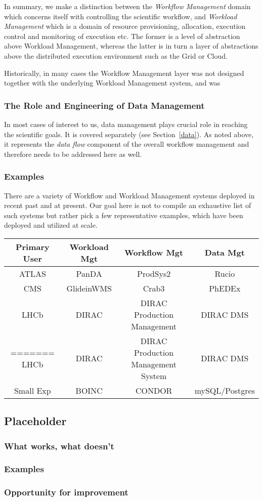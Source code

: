 In summary, we make a distinction between the \textit{Workflow Management} domain which concerns itself with controlling the scientific workflow, and \textit{Workload Management} which is a domain of resource provisioning, allocation, execution control and monitoring of execution etc. The former is a level of abstraction above Workload Management, whereas the latter is in turn a layer of abstractions above the distributed execution environment such as the Grid or Cloud.

Historically, in many cases the Workflow Management layer was not designed together with the underlying Workload Management system, and was 

\subsubsection{The Role and Engineering of Data Management}
In most cases of interest to us, data management plays crucial role in reaching the scientific goals. It is covered separately (see Section~\ref{data}). As noted above, it represents the \textit{data flow} component of the overall workflow management and therefore needs to be addressed here as well.

\subsubsection{Examples}
\label{wms_examples}
There are a variety of Workflow and Workload Management systems deployed in recent past and at present. Our goal here is not to compile an exhaustive list of such systems but rather pick a few representative examples, which have been deployed and utilized at scale.


\begin{center}
  \begin{tabular}{ c | c | c | c }
    \hline
    Primary User & Workload Mgt & Workflow Mgt & Data Mgt\\ \hline
    ATLAS & PanDA & ProdSys2 & Rucio\\ \hline
    CMS  & GlideinWMS & Crab3 & PhEDEx\\ \hline

    LHCb  & DIRAC & DIRAC Production Management & DIRAC DMS\\ \hline
=======
    LHCb  & DIRAC & DIRAC Production Management System & DIRAC DMS\\ \hline
    Small Exp & BOINC & CONDOR & mySQL/Postgres \\ \hline

    \hline
  \end{tabular}
\end{center}

\subsection{Placeholder}
\subsubsection{What works, what doesn't}
\subsubsection{Examples}
\subsubsection{Opportunity for improvement}
